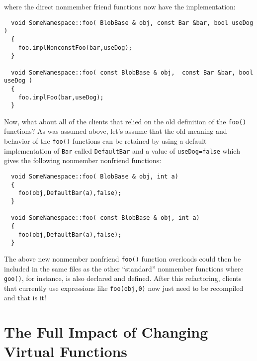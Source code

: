 \documentclass[pdf,ps2pdf,11pt]{SANDreport}
\begin{document}
{}\noindent{}where the direct nonmember friend functions now have the
implementation:

{\small\begin{verbatim}
  void SomeNamespace::foo( BlobBase & obj, const Bar &bar, bool useDog )
  {
    foo.implNonconstFoo(bar,useDog);
  }

  void SomeNamespace::foo( const BlobBase & obj,  const Bar &bar, bool useDog )
  {
    foo.implFoo(bar,useDog);
  }
\end{verbatim}}

Now, what about all of the clients that relied on the old definition of the
{}\texttt{foo()} functions?  As was assumed above, let's assume that the old
meaning and behavior of the {}\texttt{foo()} functions can be retained by
using a default implementation of {}\texttt{Bar} called {}\texttt{DefaultBar}
and a value of {}\texttt{useDog=false} which gives the following nonmember
nonfriend functions:

{\small\begin{verbatim}
  void SomeNamespace::foo( BlobBase & obj, int a)
  {
    foo(obj,DefaultBar(a),false);
  }

  void SomeNamespace::foo( const BlobBase & obj, int a)
  {
    foo(obj,DefaultBar(a),false);
  }
\end{verbatim}}

The above new nonmember nonfriend {}\texttt{foo()} function overloads could
then be included in the same files as the other ``standard'' nonmember
functions where {}\texttt{goo()}, for instance, is also declared and defined.
After this refactoring, clients that currently use expressions like
{}\texttt{foo(obj,0)} now just need to be recompiled and that is it!

%
\section{The Full Impact of Changing Virtual Functions}
%
\end{document}
